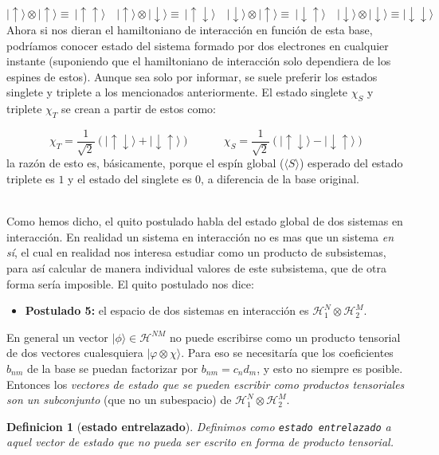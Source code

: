\documentclass[12pt,a4paper]{book}
\numberwithin{equation}{chapter}
\numberwithin{figure}{chapter}
\newcommand{\tquad}{\quad \quad \quad}
\newcommand{\parentesis}[1]{\left( #1  \right)}
\newcommand{\eup}{\mid \uparrow \rangle}
\newcommand{\edw}{\mid \downarrow \rangle}
\newcommand{\eupdw}{\mid \uparrow \downarrow \rangle}
\newcommand{\edwup}{\mid \downarrow \uparrow \rangle}
\newcommand{\Hcal}{\mathcal{H}}
\newtheorem{definition}{Definicion}[section]
\begin{document}
$$ \eup \otimes \eup \equiv  \ \mid \uparrow \uparrow \rangle \quad \eup \otimes \edw \equiv \  \mid \uparrow \downarrow\rangle \quad \edw \otimes \eup \equiv \ \mid \downarrow \uparrow \rangle \quad \edw \otimes \edw \equiv   \mid\downarrow \downarrow \rangle $$
Ahora si nos dieran el hamiltoniano de interacción en función de esta base, podríamos conocer estado del sistema formado por dos electrones en cualquier instante  (suponiendo que el hamiltoniano de interacción solo dependiera de los espines de estos). Aunque sea solo por informar, se suele preferir los estados singlete y triplete a los mencionados anteriormente. El estado singlete $\chi_S$ y triplete $\chi_T$ se crean a partir de estos como:

\begin{equation}
\chi_T = \frac{1}{\sqrt{2}} \parentesis{\eupdw + \edwup } \tquad \chi_S = \frac{1}{\sqrt{2}} \parentesis{\eupdw - \edwup }
\end{equation}
la razón de esto es, básicamente, porque el espín global ($\langle S \rangle$) esperado del estado triplete es $1$ y el estado del singlete es 0, a diferencia de la base original. 

\hrulefill \\

Como hemos dicho, el quito postulado habla del estado global de dos sistemas en interacción. En realidad un sistema en interacción no es mas que un sistema \textit{en sí}, el cual en realidad nos interesa estudiar como un producto de subsistemas, para así calcular de manera individual valores de este subsistema, que de otra forma sería imposible. El quito postulado nos dice:

\begin{itemize}
\item \textbf{Postulado 5:} el espacio de dos sistemas en interacción es $\Hcal_1^N \otimes \Hcal_2^M$.
\end{itemize}

En general un vector $|\phi\rangle \in \Hcal^{NM}$ no puede escribirse como un producto tensorial de dos vectores cualesquiera $| \varphi \otimes \chi \rangle$. Para eso se necesitaría que los coeficientes $b_{nm}$ de la base se puedan factorizar por $b_{nm} = c_n d_m$, y esto no siempre es posible. Entonces los \textit{vectores de estado que se pueden escribir como productos tensoriales son un subconjunto} (que no un subespacio) de $\Hcal_1^N \otimes \Hcal_2^M$. \\

\begin{definition}[\textbf{estado entrelazado}]
Definimos como \texttt{estado entrelazado} a aquel vector de estado que no pueda ser escrito en forma de producto tensorial. \\
\end{definition} 
\end{document}
